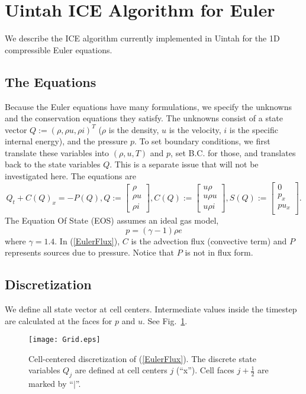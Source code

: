 \documentclass[11pt,oneside]{article}
\def \be {\begin{equation}}
\def \ee {\end{equation}}
\begin{document}

\newpage
\section{Uintah ICE Algorithm for Euler}
\label{UintahAlgorithm}

We describe the ICE algorithm currently implemented in Uintah for the 1D
compressible Euler equations.

\subsection{The Equations}
\label{EulerEq}
Because the Euler equations have many formulations, we specify the unknowns
and the conservation equations they satisfy. The unknowns consist of
a state vector $Q := (\rho,\rho u,\rho i)^T$ ($\rho$ is the density,
$u$ is the velocity, $i$ is the specific internal energy), and the pressure
$p$. To set boundary conditions, we first translate these variables into
$(\rho,u,T)$ and $p$, set B.C. for those, and translates back to the state
variables $Q$. This is a separate issue that will not be investigated here.
The equations are
\be
Q_t + C(Q)_x = -P(Q),
Q :=
\left[
\begin{array}{c}
\rho\\
\rho u\\
\rho i
\end{array}
\right],
C(Q) :=
\left[
\begin{array}{c}
u \rho\\
u \rho u\\
u \rho i
\end{array}
\right],
S(Q) :=
\left[
\begin{array}{c}
0\\
p_x\\
p u_x \\
\end{array}
\right].
\label{EulerFlux}
\ee
The Equation Of State (EOS) assumes an ideal gas model,
\be
  p = (\gamma-1) \rho e
  \label{EOS}
\ee
where $\gamma=1.4$. In (\ref{EulerFlux}), $C$ is the advection flux (convective
term) and $P$ represents sources due to pressure.
Notice that $P$ is not in flux form.

\subsection{Discretization}
We define all state vector at cell centers. Intermediate values inside
the timestep are calculated at the faces for $p$ and $u$. See
Fig.~\ref{Grid}.
\begin{figure}[htbp]
   \centering
   \texttt{[image: Grid.eps]}
   \caption{Cell-centered discretization of (\ref{EulerFlux}). The discrete
   state variables $Q_j$ are defined at cell centers $j$ (``x'').
   Cell faces $j+\frac12$ are marked by ``$|$''.}
   \label{Grid}
\end{figure}
\end{document}
